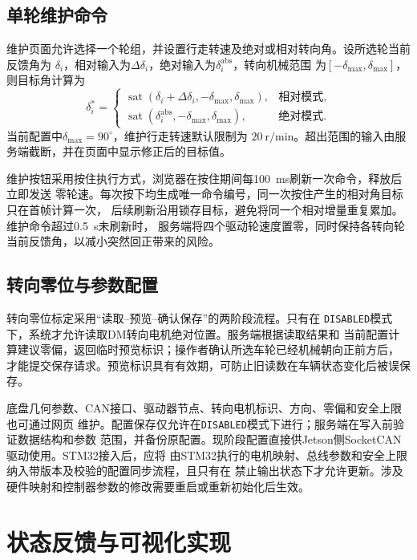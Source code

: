 \subsection{单轮维护命令}

维护页面允许选择一个轮组，并设置行走转速及绝对或相对转向角。设所选轮当前反馈角为
$\delta_i$，相对输入为$\Delta\delta_i$，绝对输入为$\delta_i^{\mathrm{abs}}$，转向机械范围
为$[-\delta_{\max},\delta_{\max}]$，则目标角计算为
\begin{equation}
    \delta_i^{*}=
    \begin{cases}
        \operatorname{sat}(\delta_i+\Delta\delta_i,
        -\delta_{\max},\delta_{\max}), & \text{相对模式},\\
        \operatorname{sat}(\delta_i^{\mathrm{abs}},
        -\delta_{\max},\delta_{\max}), & \text{绝对模式}.
    \end{cases}
    \label{eq:web-maintenance-angle}
\end{equation}
当前配置中$\delta_{\max}=90^{\circ}$，维护行走转速默认限制为
$20~\mathrm{r/min}$。超出范围的输入由服务端截断，并在页面中显示修正后的目标值。

维护按钮采用按住执行方式，浏览器在按住期间每100~ms刷新一次命令，释放后立即发送
零轮速。每次按下均生成唯一命令编号，同一次按住产生的相对角目标只在首帧计算一次，
后续刷新沿用锁存目标，避免将同一个相对增量重复累加。维护命令超过0.5~s未刷新时，
服务端将四个驱动轮速度置零，同时保持各转向轮当前反馈角，以减小突然回正带来的风险。

\subsection{转向零位与参数配置}

转向零位标定采用“读取--预览--确认保存”的两阶段流程。只有在
\texttt{DISABLED}模式下，系统才允许读取DM转向电机绝对位置。服务端根据读取结果和
当前配置计算建议零偏，返回临时预览标识；操作者确认所选车轮已经机械朝向正前方后，
才能提交保存请求。预览标识具有有效期，可防止旧读数在车辆状态变化后被误保存。

底盘几何参数、CAN接口、驱动器节点、转向电机标识、方向、零偏和安全上限也可通过网页
维护。配置保存仅允许在\texttt{DISABLED}模式下进行；服务端在写入前验证数据结构和参数
范围，并备份原配置。现阶段配置直接供Jetson侧SocketCAN驱动使用。STM32接入后，应将
由STM32执行的电机映射、总线参数和安全上限纳入带版本及校验的配置同步流程，且只有在
禁止输出状态下才允许更新。涉及硬件映射和控制器参数的修改需要重启或重新初始化后生效。

\section{状态反馈与可视化实现}

